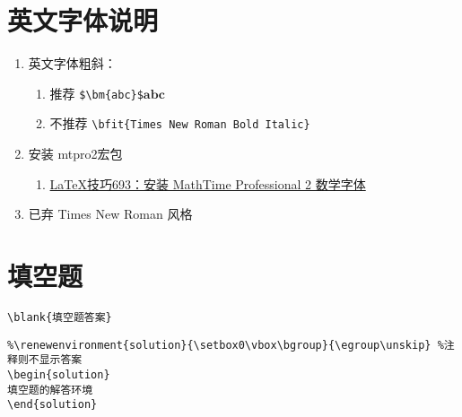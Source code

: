 \documentclass[11pt,twoside]{article} %
\begin{document}

\section{英文字体说明}

\begin{enumerate}
\item 英文字体粗斜：
\begin{enumerate}
	\item 推荐 \lstinline[style=iltx]|$\bm{abc}$|$\bm{abc}$
	\item 不推荐 \lstinline[style=iltx]|| \bfit{Times New Roman Bold Italic}
\end{enumerate}
\item 安装 mtpro2宏包
\begin{enumerate}
\item \href{http://www.latexstudio.net/archives/241.html}{LaTeX技巧693：安装 MathTime Professional 2 数学字体}
\end{enumerate}
\item 已弃 Times New Roman 风格
\end{enumerate}

\section{填空题}
\lstinline[style=iltx]|\blank{填空题答案}|  
\begin{lstlisting}
%\renewenvironment{solution}{\setbox0\vbox\bgroup}{\egroup\unskip} %注释则不显示答案
\begin{solution}
填空题的解答环境
\end{solution}
\end{lstlisting}
\end{document}
